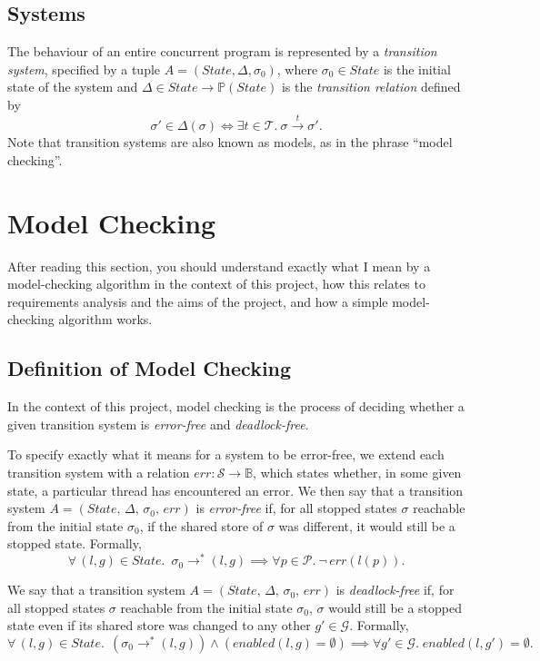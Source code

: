\documentclass[12pt,a4paper,twoside,openright]{report}
\begin{document}
\subsection{Systems}
The behaviour of an entire concurrent program is represented by a
\emph{transition system},
specified by a tuple $A = (\textit{State}, \Delta, \sigma_0)$,
where $\sigma_0 \in \textit{State}$ is the initial state of the system and
$\Delta \in State \to \mathbb{P}(State)$
is the \emph{transition relation} defined by
\[
	\sigma' \in \Delta(\sigma) \iff
	\exists t \in \mathcal{T}. \ \sigma \xrightarrow{t} \sigma'.
\]
Note that transition systems are also known as models,
as in the phrase ``model checking''.

\section{Model Checking}
After reading this section, you should
understand exactly what I mean by a
model-checking algorithm in the context
of this project, how this relates to
requirements analysis and the aims
of the project, and how a simple
model-checking algorithm works.

\subsection{Definition of Model Checking}
\label{sec:model-checking-dfn}
In the context of this project,
model checking is the process of deciding
whether a
given transition system is \emph{error-free} and
\emph{deadlock-free}.

To specify exactly what it means for a system to
be error-free, we extend each transition system
with a relation
$\textit{err} : \mathcal{S} \to \mathbb{B}$, which states
whether, in some given state, a particular
thread has encountered an error.
We then say that a transition system
$A = (\textit{State},\, \Delta,\, \sigma_0,\, \textit{err})$
is
\emph{error-free} if, for all stopped
states $\sigma$ reachable from
the initial state $\sigma_0$, if the shared store of
$\sigma$ was different, it would still be a stopped state.
Formally,
\[
	\forall\, (l, g) \in \textit{State}.\; \ \sigma_0 \longrightarrow^* (l, g)
	\implies \forall p \in \mathcal{P}.\ \neg\,\textit{err}(l(p)).
\]

We say that a transition system
$A = (\textit{State},\, \Delta,\, \sigma_0,\, \textit{err})$
is \textit{deadlock-free} if, for all stopped states
$\sigma$ reachable from
the initial state $\sigma_0$, $\sigma$ would still be a stopped
state even if its shared store was changed to any other
$g' \in \mathcal{G}$.
Formally,
\[
	\forall\, (l, g) \in \textit{State}. \;\, (\sigma_0
	 \longrightarrow^* (l, g))
	\wedge (\textit{enabled}(l, g) = \emptyset)
	\implies \forall g' \in \mathcal{G}. \;
		\textit{enabled}(l, g') = \emptyset.
\]
\end{document}
